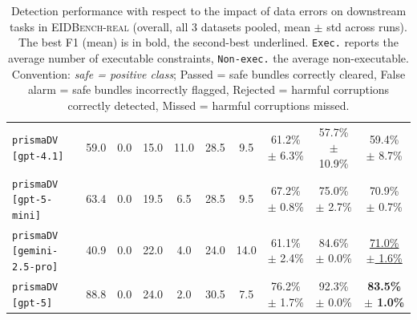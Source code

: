 \documentclass[10pt]{article}
\begin{document}
\begin{table}[t]
\begin{tabular}{l c c | c c | c c | c c c}
        \texttt{prismaDV [gpt-4.1]} & 59.0 & 0.0 & 15.0 & 11.0 & 28.5 & 9.5 & 61.2\% $\pm$ 6.3\% & 57.7\% $\pm$ 10.9\% & 59.4\% $\pm$ 8.7\% \\
        \texttt{prismaDV [gpt-5-mini]} & 63.4 & 0.0 & 19.5 & 6.5 & 28.5 & 9.5 & 67.2\% $\pm$ 0.8\% & 75.0\% $\pm$ 2.7\% & 70.9\% $\pm$ 0.7\% \\
        \texttt{prismaDV [gemini-2.5-pro]} & 40.9 & 0.0 & 22.0 & 4.0 & 24.0 & 14.0 & 61.1\% $\pm$ 2.4\% & 84.6\% $\pm$ 0.0\% & \underline{71.0\% $\pm$ 1.6\%} \\
        \texttt{prismaDV [gpt-5]} & 88.8 & 0.0 & 24.0 & 2.0 & 30.5 & 7.5 & 76.2\% $\pm$ 1.7\% & 92.3\% $\pm$ 0.0\% & \textbf{83.5\% $\pm$ 1.0\%} \\
\bottomrule
\end{tabular}
\caption{Detection performance with respect to the impact of data errors on downstream tasks in \textsc{EIDBench-real} (overall, all 3 datasets pooled, mean $\pm$ std across runs). The best F1 (mean) is in bold, the second-best underlined. \texttt{Exec.} reports the average number of executable constraints, \texttt{Non-exec.} the average non-executable. Convention: \emph{safe = positive class}; Passed = safe bundles correctly cleared, False alarm = safe bundles incorrectly flagged, Rejected = harmful corruptions correctly detected, Missed = harmful corruptions missed.}
\label{tab:realetlbench-f1}
\end{table}
\end{document}
